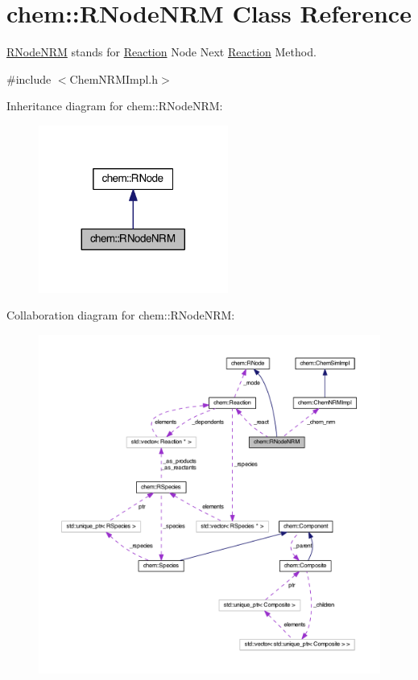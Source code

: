 \hypertarget{classchem_1_1RNodeNRM}{\section{chem\-:\-:R\-Node\-N\-R\-M Class Reference}
\label{classchem_1_1RNodeNRM}
}


\hyperlink{classchem_1_1RNodeNRM}{R\-Node\-N\-R\-M} stands for \hyperlink{classchem_1_1Reaction}{Reaction} Node Next \hyperlink{classchem_1_1Reaction}{Reaction} Method.  




{\ttfamily \#include $<$Chem\-N\-R\-M\-Impl.\-h$>$}



Inheritance diagram for chem\-:\-:R\-Node\-N\-R\-M\-:\nopagebreak
\begin{figure}[H]
\begin{center}
\leavevmode
\includegraphics[width=176pt]{classchem_1_1RNodeNRM__inherit__graph}
\end{center}
\end{figure}


Collaboration diagram for chem\-:\-:R\-Node\-N\-R\-M\-:\nopagebreak
\begin{figure}[H]
\begin{center}
\leavevmode
\includegraphics[width=350pt]{classchem_1_1RNodeNRM__coll__graph}
\end{center}
\end{figure}
